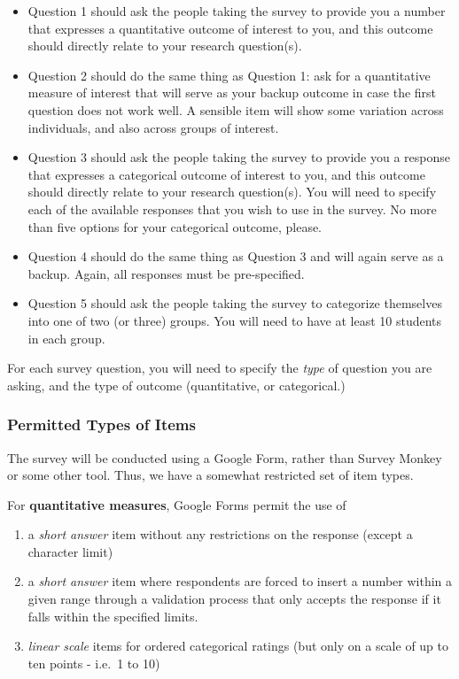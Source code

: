 \documentclass[]{book}
\providecommand{\tightlist}{%
  \setlength{\itemsep}{0pt}\setlength{\parskip}{0pt}}
\theoremstyle{definition}
\theoremstyle{definition}
\theoremstyle{definition}
\theoremstyle{remark}
\begin{document}
\begin{itemize}
\tightlist
\item
  Question 1 should ask the people taking the survey to provide you a
  number that expresses a quantitative outcome of interest to you, and
  this outcome should directly relate to your research question(s).
\item
  Question 2 should do the same thing as Question 1: ask for a
  quantitative measure of interest that will serve as your backup
  outcome in case the first question does not work well. A sensible item
  will show some variation across individuals, and also across groups of
  interest.
\item
  Question 3 should ask the people taking the survey to provide you a
  response that expresses a categorical outcome of interest to you, and
  this outcome should directly relate to your research question(s). You
  will need to specify each of the available responses that you wish to
  use in the survey. No more than five options for your categorical
  outcome, please.
\item
  Question 4 should do the same thing as Question 3 and will again serve
  as a backup. Again, all responses must be pre-specified.
\item
  Question 5 should ask the people taking the survey to categorize
  themselves into one of two (or three) groups. You will need to have at
  least 10 students in each group.
\end{itemize}

For each survey question, you will need to specify the \emph{type} of
question you are asking, and the type of outcome (quantitative, or
categorical.)

\hypertarget{permitted-types-of-items}{%
\subsubsection{Permitted Types of
Items}\label{permitted-types-of-items}}

The survey will be conducted using a Google Form, rather than Survey
Monkey or some other tool. Thus, we have a somewhat restricted set of
item types.

For \textbf{quantitative measures}, Google Forms permit the use of

\begin{enumerate}
\def\labelenumi{\arabic{enumi}.}
\tightlist
\item
  a \emph{short answer} item without any restrictions on the response
  (except a character limit)
\item
  a \emph{short answer} item where respondents are forced to insert a
  number within a given range through a validation process that only
  accepts the response if it falls within the specified limits.
\item
  \emph{linear scale} items for ordered categorical ratings (but only on
  a scale of up to ten points - i.e.~1 to 10)
\end{enumerate}
\end{document}
